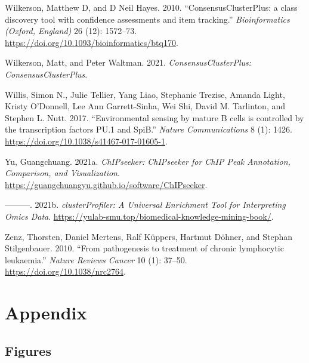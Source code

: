 \documentclass[11pt, a4paper, twosided]{book}
\newenvironment{CSLReferences}%
  {}%
  {\par}
\begin{document}
\begin{CSLReferences}{1}{0}
\leavevmode{}%
Wilkerson, Matthew D, and D Neil Hayes. 2010. {``{ConsensusClusterPlus: a class discovery tool with confidence assessments and item tracking.}''} \emph{Bioinformatics (Oxford, England)} 26 (12): 1572--73. \url{https://doi.org/10.1093/bioinformatics/btq170}.

\leavevmode{}%
Wilkerson, Matt, and Peter Waltman. 2021. \emph{ConsensusClusterPlus: ConsensusClusterPlus}.

\leavevmode{}%
Willis, Simon N., Julie Tellier, Yang Liao, Stephanie Trezise, Amanda Light, Kristy O'Donnell, Lee Ann Garrett-Sinha, Wei Shi, David M. Tarlinton, and Stephen L. Nutt. 2017. {``{Environmental sensing by mature B cells is controlled by the transcription factors PU.1 and SpiB}.''} \emph{Nature Communications} 8 (1): 1426. \url{https://doi.org/10.1038/s41467-017-01605-1}.

\leavevmode{}%
Yu, Guangchuang. 2021a. \emph{ChIPseeker: ChIPseeker for ChIP Peak Annotation, Comparison, and Visualization}. \url{https://guangchuangyu.github.io/software/ChIPseeker}.

\leavevmode{}%
---------. 2021b. \emph{clusterProfiler: A Universal Enrichment Tool for Interpreting Omics Data}. \url{https://yulab-smu.top/biomedical-knowledge-mining-book/}.

\leavevmode{}%
Zenz, Thorsten, Daniel Mertens, Ralf Küppers, Hartmut Döhner, and Stephan Stilgenbauer. 2010. {``{From pathogenesis to treatment of chronic lymphocytic leukaemia}.''} \emph{Nature Reviews Cancer} 10 (1): 37--50. \url{https://doi.org/10.1038/nrc2764}.

\end{CSLReferences}
\indent
\setlength{\parindent}{17pt}
\setlength{\leftskip}{0pt}
\setlength{\parskip}{0pt}

\newpage

\hypertarget{appendix}{%
\chapter*{Appendix}\label{appendix}}

\hypertarget{figures}{%
\section*{Figures}\label{figures}}
\end{document}
